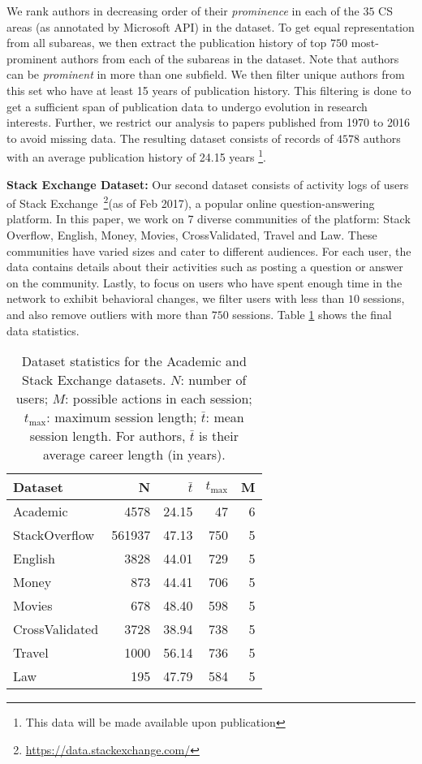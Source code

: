 We rank authors in decreasing order of their \emph{prominence} in each of the $35$ CS areas (as annotated by Microsoft API) in the dataset. To get equal representation from all subareas, we then extract the publication history of top $750$ most-prominent authors from each of the subareas in the dataset. Note that authors can be \emph{prominent} in more than one subfield. We then filter unique authors from this set who have at least 15 years of publication history. This filtering is done to get a sufficient span of publication data to undergo evolution in research interests. Further, we restrict our analysis to papers published from 1970 to 2016 to avoid missing data. The resulting dataset consists of records of $4578$ authors with an average publication history of 24.15 years \footnote{This data will be made available upon publication}.

\textbf{Stack Exchange Dataset:}
Our second dataset consists of activity logs of users of Stack Exchange~\footnote{\url{https://data.stackexchange.com/}}(as of Feb 2017), a popular online question-answering platform.
In this paper, we work on 7 diverse communities of the platform:
Stack Overflow, English, Money, Movies, CrossValidated, Travel and Law. These communities have varied sizes and cater to different audiences. For each user, the data contains details about their activities such as posting a question or answer on the community.
Lastly, to focus on users who have spent enough time in the network to exhibit behavioral changes, we filter users with less than $10$ sessions, and also remove outliers with more than $750$ sessions. Table \ref{tab:datastats} shows the final data statistics.

\begin{table}[tbh]
 \centering
 \begin{tabular}{p{30mm} r r r r}
  \toprule
  Dataset                 & N       & $\bar{t}$ & $t_{\max}$ & M \\  \midrule
  Academic       & 4578      & 24.15   & 47     & 6                      \\
  StackOverflow & 561937    & 47.13   & 750    & 5                      \\
  English & 3828    & 44.01   & 729    & 5                      \\
  Money & 873   & 44.41   & 706    & 5                      \\
  Movies & 678    & 48.40   & 598    & 5                      \\
  CrossValidated & 3728    & 38.94   & 738    & 5                      \\
  Travel & 1000    & 56.14   & 736    & 5                      \\
  Law & 195    & 47.79   & 584    & 5                      \\
   \bottomrule
 \end{tabular}
 \caption{\label{tab:datastats}Dataset statistics for the Academic and Stack Exchange datasets. $N$: number of users; $M$: possible actions in each session; $t_{\max}$: maximum session length; $\bar{t}$: mean session length. For authors, $\bar{t}$ is their average career length (in years). }
\end{table}



